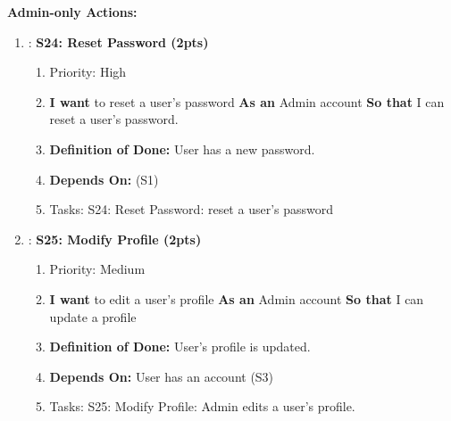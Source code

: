 \textbf{Admin-only Actions:}
\begin{enumerate}[nosep]
    \item: \textbf{S24: Reset Password (2pts)}
    \begin{enumerate}[nosep]
        \item Priority: High 
        \item \textbf{I want} to reset a user's password \textbf{As an} Admin account \textbf{So that} I can reset a user's password.
        \item \textbf{Definition of Done:} User has a new password.
        \item \textbf{Depends On:} (S1)
        \item Tasks: S24: Reset Password: reset a user's password
    \end{enumerate}

    \item: \textbf{S25: Modify Profile (2pts)}
    \begin{enumerate}[nosep]
        \item Priority: Medium
        \item \textbf{I want} to edit a user's profile \textbf{As an} Admin account \textbf{So that} I can update a profile
        \item \textbf{Definition of Done:} User's profile is updated.
        \item \textbf{Depends On:} User has an account (S3)
        \item Tasks: S25: Modify Profile: Admin edits a user's profile.
    \end{enumerate}
\end{enumerate}

